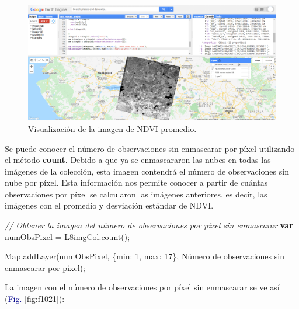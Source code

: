 \documentclass[
  12pt,
  letterpaper,
  twoside]{book}
\newenvironment{Shaded}{\begin{snugshade}}{\end{snugshade}}
\newcommand{\BuiltInTok}[1]{#1}
\newcommand{\CommentTok}[1]{\textcolor[rgb]{0.24,0.58,0.00}{\textit{#1}}}
\newcommand{\DataTypeTok}[1]{\textcolor[rgb]{0.00,0.00,0.00}{#1}}
\newcommand{\DecValTok}[1]{\textcolor[rgb]{0.28,0.53,0.93}{#1}}
\newcommand{\FunctionTok}[1]{\textcolor[rgb]{0.48,0.12,0.64}{#1}}
\newcommand{\KeywordTok}[1]{\textcolor[rgb]{0.00,0.00,0.00}{\textbf{#1}}}
\newcommand{\NormalTok}[1]{#1}
\newcommand{\OperatorTok}[1]{\textcolor[rgb]{0.00,0.00,0.00}{#1}}
\newcommand{\StringTok}[1]{\textcolor[rgb]{0.87,0.29,0.22}{#1}}
\newcommand\boldpurple[1]{\textcolor{darkpurple}{\textbf{#1}}}
\begin{document}
\begin{figure}[H]

{\centering \includegraphics[width=0.95\linewidth]{Img/imNDVI} 

}

\caption{Visualización de la imagen de NDVI promedio.}\label{fig:f1020}
\end{figure}

Se puede conocer el número de observaciones sin enmascarar por píxel utilizando el método \boldpurple{count}. Debido a que ya se enmascararon las nubes en todas las imágenes de la colección, esta imagen contendrá el número de observaciones sin nube por píxel. Esta información nos permite conocer a partir de cuántas observaciones por píxel se calcularon las imágenes anteriores, es decir, las imágenes con el promedio y desviación estándar de NDVI.

\begin{Shaded}
\begin{Highlighting}[]
\CommentTok{// Obtener la imagen del número de observaciones por píxel sin enmascarar }
\KeywordTok{var}\NormalTok{ numObsPixel }\OperatorTok{=}\NormalTok{ L8imgCol}\OperatorTok{.}\FunctionTok{count}\NormalTok{()}\OperatorTok{;}

\BuiltInTok{Map}\OperatorTok{.}\FunctionTok{addLayer}\NormalTok{(numObsPixel}\OperatorTok{,}
\NormalTok{  \{}\DataTypeTok{min}\OperatorTok{:} \DecValTok{1}\OperatorTok{,} \DataTypeTok{max}\OperatorTok{:} \DecValTok{17}\NormalTok{\}}\OperatorTok{,}
  \StringTok{\textquotesingle{}Número de observaciones sin enmascarar por píxel\textquotesingle{}}\NormalTok{)}\OperatorTok{;}
\end{Highlighting}
\end{Shaded}

La imagen con el número de observaciones por píxel sin enmascarar se ve así (\textcolor{darkblue}{Fig.} \ref{fig:f1021}):
\end{document}
